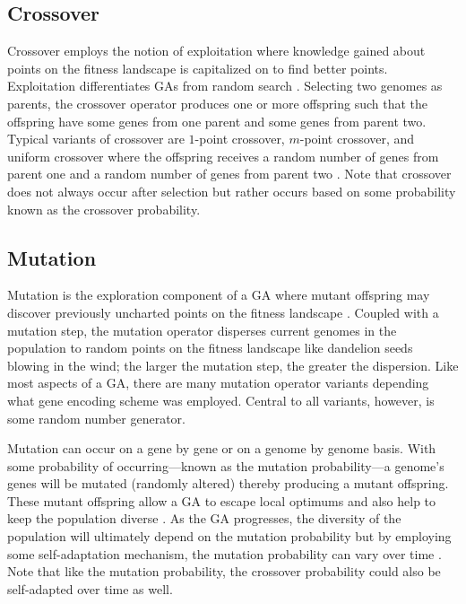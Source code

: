 \subsection{Crossover}

Crossover employs the notion of exploitation where knowledge gained about points on the fitness landscape is capitalized on to find better points. Exploitation differentiates GAs from random search \cite{Beasley93anoverview}. Selecting two genomes as parents, the crossover operator produces one or more offspring such that the offspring have some genes from one parent and some genes from parent two. Typical variants of crossover are $1$-point crossover, $m$-point crossover, and uniform crossover where the offspring receives a random number of genes from parent one and a random number of genes from parent two \cite{ColinReeves}. Note that crossover does not always occur after selection but rather occurs based on some probability known as the crossover probability.    

\subsection{Mutation}

Mutation is the exploration component of a GA where mutant offspring may discover previously uncharted points on the fitness landscape \cite{Beasley93anoverview}. Coupled with a mutation step, the mutation operator disperses current genomes in the population to random points on the fitness landscape like dandelion seeds blowing in the wind; the larger the mutation step, the greater the dispersion. Like most aspects of a GA, there are many mutation operator variants depending what gene encoding scheme was employed. Central to all variants, however, is some random number generator. 

Mutation can occur on a gene by gene or on a genome by genome basis. With some probability of occurring---known as the mutation probability---a genome's genes will be mutated (randomly altered) thereby producing a mutant offspring. These mutant offspring allow a GA to escape local optimums and also help to keep the population diverse \cite{ColinReeves}. As the GA progresses, the diversity of the population will ultimately depend on the mutation probability but by employing some self-adaptation mechanism, the mutation probability can vary over time \cite{ColinReeves}. Note that like the mutation probability, the crossover probability could also be self-adapted over time as well.       

